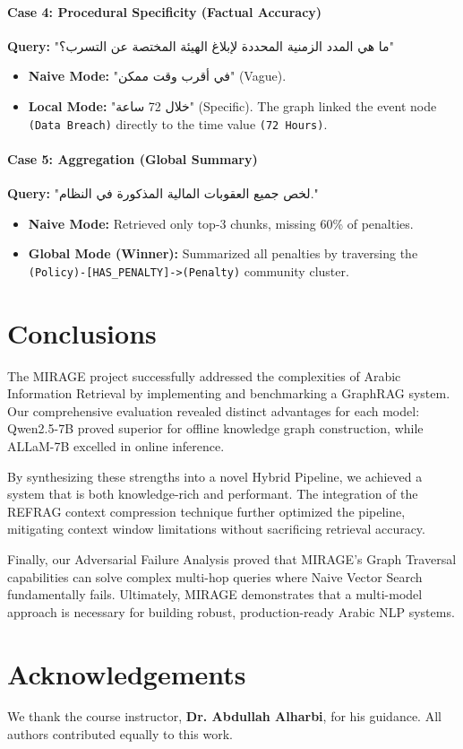 \documentclass[11pt, onecolumn]{article}
\begin{document}
\paragraph{Case 4: Procedural Specificity (Factual Accuracy)}
\textbf{Query:} \textarabic{"ما هي المدد الزمنية المحددة لإبلاغ الهيئة المختصة عن التسرب؟"}
\begin{itemize}
    \item \textbf{Naive Mode:} \textarabic{"في أقرب وقت ممكن"} (Vague).
    \item \textbf{Local Mode:} \textarabic{"خلال 72 ساعة"} (Specific). The graph linked the event node \texttt{(Data Breach)} directly to the time value \texttt{(72 Hours)}.
\end{itemize}

\paragraph{Case 5: Aggregation (Global Summary)}
\textbf{Query:} \textarabic{"لخص جميع العقوبات المالية المذكورة في النظام."}
\begin{itemize}
    \item \textbf{Naive Mode:} Retrieved only top-3 chunks, missing 60\% of penalties.
    \item \textbf{Global Mode (Winner):} Summarized all penalties by traversing the \texttt{(Policy)-[HAS\_PENALTY]->(Penalty)} community cluster.
\end{itemize}

\section{Conclusions}
The MIRAGE project successfully addressed the complexities of Arabic Information Retrieval by implementing and benchmarking a GraphRAG system. Our comprehensive evaluation revealed distinct advantages for each model: Qwen2.5-7B proved superior for offline knowledge graph construction, while ALLaM-7B excelled in online inference.

By synthesizing these strengths into a novel Hybrid Pipeline, we achieved a system that is both knowledge-rich and performant. The integration of the REFRAG context compression technique further optimized the pipeline, mitigating context window limitations without sacrificing retrieval accuracy. 

Finally, our Adversarial Failure Analysis proved that MIRAGE's Graph Traversal capabilities can solve complex multi-hop queries where Naive Vector Search fundamentally fails. Ultimately, MIRAGE demonstrates that a multi-model approach is necessary for building robust, production-ready Arabic NLP systems.

\section{Acknowledgements}
We thank the course instructor, \textbf{Dr. Abdullah Alharbi}, for his guidance. All authors contributed equally to this work.
\end{document}
